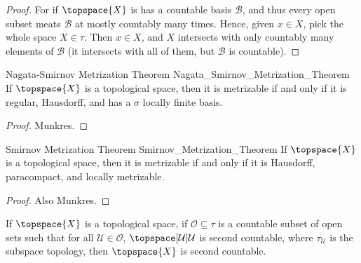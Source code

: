 \documentclass{article}                                                        %
\begin{document}
        \begin{proof}
            For if $\topspace{X}$ is has a countable basis $\mathcal{B}$, and
            thus every open subset meats $\mathcal{B}$ at mostly countably many
            times. Hence, given $x\in{X}$, pick the whole space $X\in\tau$.
            Then $x\in{X}$, and $X$ intersects with only countably many elements
            of $\mathcal{B}$ (it intersects with all of them, but $\mathcal{B}$
            is countable).
        \end{proof}
        \begin{ftheorem}{Nagata-Smirnov Metrization Theorem}
                        {Nagata_Smirnov_Metrization_Theorem}
            If $\topspace{X}$ is a topological space, then it is metrizable if
            and only if it is regular, Hausdorff, and has a $\sigma$ locally
            finite basis.
        \end{ftheorem}
        \begin{proof}
            Munkres.
        \end{proof}
        \begin{ftheorem}{Smirnov Metrization Theorem}
                        {Smirnov_Metrization_Theorem}
            If $\topspace{X}$ is a topological space, then it is metrizable if
            and only if it is Hausdorff, paracompact, and locally metrizable.
        \end{ftheorem}
        \begin{proof}
            Also Munkres.
        \end{proof}
        \begin{theorem}
            If $\topspace{X}$ is a topological space, if
            $\mathcal{O}\subseteq\tau$ is a countable subset of open sets such
            that for all $\mathcal{U}\in\mathcal{O}$,
            $\topspace[\mathcal{U}]{\mathcal{U}}$ is second countable, where
            $\tau_{\mathcal{U}}$ is the subspace topology, then $\topspace{X}$
            is second countable.
        \end{theorem}
\end{document}
